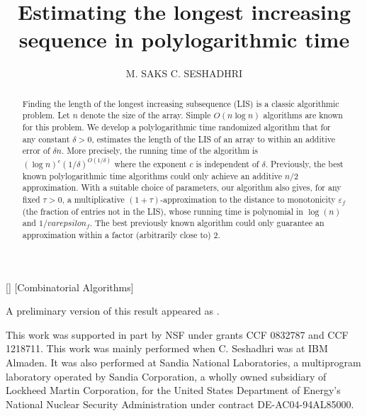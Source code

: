 \documentclass{acmsmall}
\title{Estimating the longest increasing sequence in polylogarithmic time}
\date{}
\begin{document}
 



\author{M. SAKS
C. SESHADHRI
}

\begin{abstract}
Finding the length of the longest increasing subsequence (LIS) is
a classic algorithmic problem. Let $n$ denote the size
of the array. Simple $O(n\log n)$ algorithms
are known for this problem.  We develop a polylogarithmic time
randomized algorithm that for any constant $\delta > 0$,
estimates the length of the LIS of an array to within an additive error of $\delta n$.
More precisely, the running time of the algorithm
is $(\log n)^c (1/\delta)^{O(1/\delta)}$ where the exponent $c$
is independent of $\delta$.
Previously, the
best known polylogarithmic time algorithms could only
achieve an additive $n/2$ approximation.  With a suitable choice of parameters,
our algorithm also gives, for any fixed $\tau>0$,  a multiplicative
$(1+\tau)$-approximation to the distance to monotonicity $\varepsilon_f$ (the fraction of entries not in the LIS),
whose running time is polynomial in $\log(n)$ and $1/varepsilon_f$.  The best previously known algorithm
could only guarantee an approximation within a factor (arbitrarily close to) 2.
%
\end{abstract}

[]
[Combinatorial Algorithms]



\begin{bottomstuff}
A preliminary version of this result appeared as \cite{SaSe10}.

This work was supported in part by NSF under grants CCF 0832787 and CCF 1218711.
This work was mainly performed when C. Seshadhri was at IBM Almaden.
It was also
performed at Sandia National
Laboratories, a multiprogram laboratory operated by Sandia
Corporation, a wholly owned subsidiary of Lockheed Martin Corporation,
for the United States Department of Energy's National Nuclear Security
Administration under contract DE-AC04-94AL85000.
\end{bottomstuff}
\end{document}
